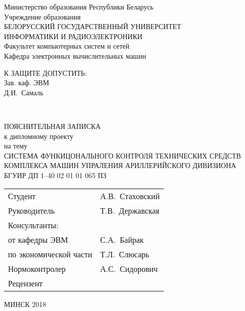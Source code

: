 \begin{titlepage}
  \begin{center}
    Министерство образования Республики Беларусь \\[1em]
    Учреждение образования \\
    БЕЛОРУССКИЙ ГОСУДАРСТВЕННЫЙ УНИВЕРСИТЕТ \\
    ИНФОРМАТИКИ И РАДИОЭЛЕКТРОНИКИ \\[1em]

    Факультет компьютерных систем и сетей \\ [1em]
    Кафедра электронных вычислительных машин \\[2em]

    \begin{flushright}
      \begin{minipage}{0.4\textwidth}
        К ЗАЩИТЕ ДОПУСТИТЬ: \\
        Зав. каф. ЭВМ \\
        \underline{\hspace*{2.8cm}} Д.И.~Самаль
      \end{minipage}\\[2.2em]
    \end{flushright}

    {ПОЯСНИТЕЛЬНАЯ ЗАПИСКА}\\
    {к дипломному проекту}\\
    {на тему}\\
    {СИСТЕМА ФУНКИЦОНАЛЬНОГО КОНТРОЛЯ ТЕХНИЧЕСКИХ СРЕДСТВ КОМПЛЕКСА МАШИН УПРАЛЕНИЯ АРИЛЛЕРИЙСКОГО ДИВИЗИОНА}\\[2em]


    {БГУИР ДП 1--40 02 01 01 065 ПЗ}\\[2em]

  \begin{flushleft}
	  \begin{tabular}{>{\raggedright}p{}p{} }
      Студент & А.В.~Стаховский\\[1em]
      Руководитель & Т.В.~Державская \\[1em]
      Консультанты: &\\[1em]
      \hspace*{3ex}от кафедры ЭВМ & С.А.~Байрак \\[1em]
      \hspace*{3ex}по экономической части & Т.Л.~Слюсарь \\[1em]
      Нормоконтролер & А.С.~Сидорович\\[1em]
      Рецензент &
    \end{tabular}
  \end{flushleft}

    \vfill
    {\normalsize МИНСК 2018}
  \end{center}
\end{titlepage}
